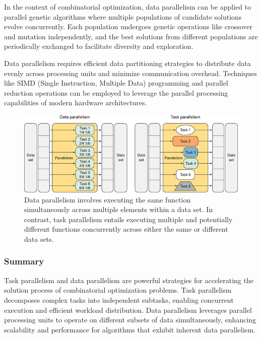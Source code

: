 \documentclass[11pt]{report}
\begin{document}
            In the context of combinatorial optimization, data parallelism can be applied to parallel genetic algorithms where multiple populations of candidate solutions evolve concurrently. Each population undergoes genetic operations like crossover and mutation independently, and the best solutions from different populations are periodically exchanged to facilitate diversity and exploration.
        
            Data parallelism requires efficient data partitioning strategies to distribute data evenly across processing units and minimize communication overhead. Techniques like SIMD (Single Instruction, Multiple Data) programming and parallel reduction operations can be employed to leverage the parallel processing capabilities of modern hardware architectures.

        \begin{figure}[h]
            \centering
            \includegraphics[width=1\textwidth,keepaspectratio]{Images/parallelisim.png}
            \caption{Data parallelism involves executing the same function simultaneously across multiple elements within a data set. In contrast, task parallelism entails executing multiple and potentially different functions concurrently across either the same or different data sets.}
            \label{fig:data-task-parallelism}
        \end{figure}

        \subsubsection{Summary}
            Task parallelism and data parallelism are powerful strategies for accelerating the solution process of combinatorial optimization problems. Task parallelism decomposes complex tasks into independent subtasks, enabling concurrent execution and efficient workload distribution. Data parallelism leverages parallel processing units to operate on different subsets of data simultaneously, enhancing scalability and performance for algorithms that exhibit inherent data parallelism.
\end{document}
